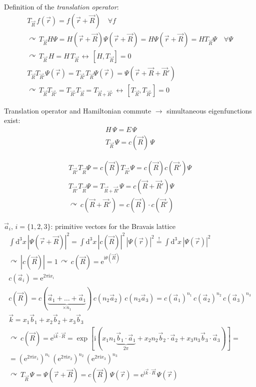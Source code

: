 \documentclass[fontsize=11pt,a4paper]{scrartcl}
\begin{document}
Definition of the \emph{translation operator}:
\begin{gather*}
	T_{\vec R}\,f(\vec r)=f(\vec r+\vec R)\quad\forall f\\
	\curvearrowright\, T_{\vec R}H\Psi=H(\vec r+\vec R)\Psi(\vec r+\vec R)=H\Psi(\vec r+\vec R)=H T_{\vec R}\Psi\quad\forall\Psi\\
	\curvearrowright\,T_{\vec R}\, H=H\,T_{\vec R}\,\leftrightarrow\,[H,T_{\vec R}]=0\\
	T_{\vec R}T_{\vec R'}\Psi(\vec r)=T_{\vec R'}T_{\vec R}\Psi(\vec r)=\Psi(\vec r+\vec R+\vec R')\\
	\curvearrowright\,T_{\vec R}T_{\vec R'}=T_{\vec R'}T_{\vec R}=T_{\vec R+\vec R'}\,\leftrightarrow\,[T_{\vec R},T_{\vec R'}]=0
\end{gather*}

Translation operator and Hamiltonian commute $\to$ simultaneous eigenfunctions exist:
\begin{gather*}
	H\,\Psi=E\,\Psi\\
	T_{\vec R}\,\Psi=c(\vec R)\,\Psi
\end{gather*}

\begin{gather*}
	T_{\vec R'}T_{\vec R}\Psi=c(\vec R)T_{\vec R'}\Psi=c(\vec R)c(\vec R')\Psi\\
	T_{\vec R'}T_{\vec R}\Psi=T_{\vec R+\vec R'}\Psi=c(\vec R+\vec R')\Psi\\
	\curvearrowright\,c(\vec R+\vec R')=c(\vec R)\cdot c(\vec R')
\end{gather*}

$\vec a_i,\,i=\{1,2,3\}$: primitive vectors for the Bravais lattice
\begin{gather*}
	\int\mathrm{d}^3 x\, |\Psi(\vec r+\vec R)|^2=\int\mathrm{d}^3 x\, |c(\vec R)|^2\,|\Psi(\vec r)|^2\stackrel{!}{=}\int\mathrm{d}^3 x\,|\Psi(\vec r)|^2\\
	\curvearrowright\,|c(\vec R)|=1\,\curvearrowright\,c(\vec R)=\mathrm{e}^{\mathrm{i}\theta(\vec R)}\\
	c(\vec a_i)=\mathrm{e}^{2\pi\mathrm{i} x_i}\\
	c(\vec R)=c(\underbrace{\vec a_1+\dots+\vec a_1}_{\times n_1})\,c(n_2\vec a_2)\,c(n_3\vec a_3)=c(\vec a_1)^{n_1}\,c(\vec a_2)^{n_2}\,c(\vec a_3)^{n_3}\\
	\vec k=x_1\vec b_1+x_2\vec b_2+x_3\vec b_3\\
	\curvearrowright\,c(\vec R)=\mathrm{e}^{\mathrm{i}\vec k\cdot\vec R}=\exp[\mathrm{i}(x_1 n_1\underbrace{\vec b_1\cdot\vec a_1}_{2\pi}+x_2 n_2\vec b_2\cdot\vec a_2+x_3 n_3\vec b_3\cdot\vec a_3)]=\\
	=\left(\mathrm{e}^{2\pi\mathrm{i}x_1}\right)^{n_1}\,\left(\mathrm{e}^{2\pi\mathrm{i}x_2}\right)^{n_2}\,\left(\mathrm{e}^{2\pi\mathrm{i}x_3}\right)^{n_3}\\
	\curvearrowright\,T_{\vec R}\,\Psi=\Psi(\vec r+\vec R)=c(\vec R)\,\Psi(\vec r)=\mathrm{e}^{\mathrm{i}\vec k\cdot\vec R}\,\Psi(\vec r)
\end{gather*}
\end{document}
